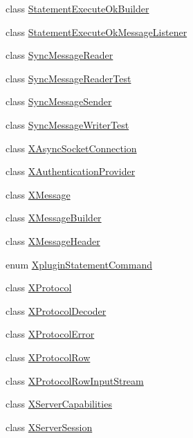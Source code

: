 \begin{DoxyCompactItemize}
\item 
class \mbox{\hyperlink{classcom_1_1mysql_1_1cj_1_1protocol_1_1x_1_1_statement_execute_ok_builder}{Statement\+Execute\+Ok\+Builder}}
\item 
class \mbox{\hyperlink{classcom_1_1mysql_1_1cj_1_1protocol_1_1x_1_1_statement_execute_ok_message_listener}{Statement\+Execute\+Ok\+Message\+Listener}}
\item 
class \mbox{\hyperlink{classcom_1_1mysql_1_1cj_1_1protocol_1_1x_1_1_sync_message_reader}{Sync\+Message\+Reader}}
\item 
class \mbox{\hyperlink{classcom_1_1mysql_1_1cj_1_1protocol_1_1x_1_1_sync_message_reader_test}{Sync\+Message\+Reader\+Test}}
\item 
class \mbox{\hyperlink{classcom_1_1mysql_1_1cj_1_1protocol_1_1x_1_1_sync_message_sender}{Sync\+Message\+Sender}}
\item 
class \mbox{\hyperlink{classcom_1_1mysql_1_1cj_1_1protocol_1_1x_1_1_sync_message_writer_test}{Sync\+Message\+Writer\+Test}}
\item 
class \mbox{\hyperlink{classcom_1_1mysql_1_1cj_1_1protocol_1_1x_1_1_x_async_socket_connection}{X\+Async\+Socket\+Connection}}
\item 
class \mbox{\hyperlink{classcom_1_1mysql_1_1cj_1_1protocol_1_1x_1_1_x_authentication_provider}{X\+Authentication\+Provider}}
\item 
class \mbox{\hyperlink{classcom_1_1mysql_1_1cj_1_1protocol_1_1x_1_1_x_message}{X\+Message}}
\item 
class \mbox{\hyperlink{classcom_1_1mysql_1_1cj_1_1protocol_1_1x_1_1_x_message_builder}{X\+Message\+Builder}}
\item 
class \mbox{\hyperlink{classcom_1_1mysql_1_1cj_1_1protocol_1_1x_1_1_x_message_header}{X\+Message\+Header}}
\item 
enum \mbox{\hyperlink{enumcom_1_1mysql_1_1cj_1_1protocol_1_1x_1_1_xplugin_statement_command}{Xplugin\+Statement\+Command}}
\item 
class \mbox{\hyperlink{classcom_1_1mysql_1_1cj_1_1protocol_1_1x_1_1_x_protocol}{X\+Protocol}}
\item 
class \mbox{\hyperlink{classcom_1_1mysql_1_1cj_1_1protocol_1_1x_1_1_x_protocol_decoder}{X\+Protocol\+Decoder}}
\item 
class \mbox{\hyperlink{classcom_1_1mysql_1_1cj_1_1protocol_1_1x_1_1_x_protocol_error}{X\+Protocol\+Error}}
\item 
class \mbox{\hyperlink{classcom_1_1mysql_1_1cj_1_1protocol_1_1x_1_1_x_protocol_row}{X\+Protocol\+Row}}
\item 
class \mbox{\hyperlink{classcom_1_1mysql_1_1cj_1_1protocol_1_1x_1_1_x_protocol_row_input_stream}{X\+Protocol\+Row\+Input\+Stream}}
\item 
class \mbox{\hyperlink{classcom_1_1mysql_1_1cj_1_1protocol_1_1x_1_1_x_server_capabilities}{X\+Server\+Capabilities}}
\item 
class \mbox{\hyperlink{classcom_1_1mysql_1_1cj_1_1protocol_1_1x_1_1_x_server_session}{X\+Server\+Session}}
\end{DoxyCompactItemize}
